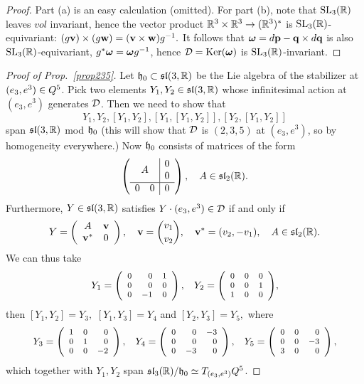 \begin{proof}
 Part (a) is an easy calculation (omitted). For part (b), note that ${\mathrm{SL}_3(\mathbb{R})}$ leaves $vol$ invariant, hence the vector product $\mathbb{R}^3\times \mathbb{R}^3\to(\mathbb{R}^3)^*$ is ${\mathrm{SL}_3(\mathbb{R})}$-equivariant: $(g{\mathbf v})\times (g{\mathbf w})=({\mathbf v}\times{\mathbf w})g^{-1}.$ It follows that $\boldsymbol{\omega}=d{\mathbf p}-\mathbf q\times d\mathbf q$ is also ${\mathrm{SL}_3(\mathbb{R})}$-equivariant, $g^*\boldsymbol{\omega}=\boldsymbol{\omega} g^{-1}$, hence ${\mathcal D}={\rm Ker}(\boldsymbol{\omega})$ is ${\mathrm{SL}_3(\mathbb{R})}$-invariant.\end{proof}

\begin{proof}[Proof of Prop.~\ref{prop235}] Let ${\mathfrak h}_0\subset\mathfrak{sl}(3,\mathbb{R})$ 
be the  Lie algebra of the stabilizer  at $(e_3, e^3)\in Q^5$. Pick two 
elements $Y_1, Y_2\in\mathfrak{sl}(3,\mathbb{R})$ whose infinitesimal action at $(e_3, e^3)$ generates ${\mathcal D}$.  Then we need to show that 
$$Y_1, Y_2, [Y_1,Y_2],[Y_1,[Y_1,Y_2]],  [Y_2, [Y_1,Y_2]]$$ span $\mathfrak{sl}(3,\mathbb{R})$ mod ${\mathfrak h}_0$ (this will show that ${\mathcal D}$ is $(2,3,5)$ at $(e_3,e^3) $, so by homogeneity everywhere.)
%
Now ${\mathfrak h}_0$ consists of matrices of the form 
%
$$
\left(\begin{array}{c|c}
A&\begin{matrix} 0\\ 0\end{matrix}\\
\hline
\begin{matrix}0& 0\end{matrix}&0
\end{array}
\right),\quad A\in\mathfrak{sl}_2(\mathbb{R}).
$$
%
Furthermore, $Y\in\mathfrak{sl}(3,\mathbb{R})$ satisfies $Y\cdot(e_3, e^3)\in{\mathcal D}$ if and only if 
$$Y=\left(\begin{array}{cc}A&{\mathbf v}\\ {\mathbf v}^*& 0\end{array}\right),\quad {\mathbf v}={v_1\choose v_2}, \quad {\mathbf v}^*=(v_2, -v_1),  \quad A\in\mathfrak{sl}_2(\mathbb{R}).$$ 
We can thus take 
%
$$ 
Y_1=\footnotesize{ 
\left( 
\begin{array}{rrr}
0&0&1\\ 
0&0&0\\ 
0&-1&0
\end{array} 
\right), \quad
Y_2=\left( 
\begin{array}{rrr}
0&0&0\\ 
0&0&1\\ 
1&0&0
\end{array}
\right)},$$
then $[Y_1, Y_2]=Y_3,$ $[Y_1,Y_3]=Y_4$ and $[Y_2,Y_3]=Y_5,$ where 
%
$$ 
Y_3=\footnotesize{ 
\left( 
\begin{array}{rrr}
1&0&0\\ 
0&1&0\\ 
0&0&-2
\end{array}   
\right),  \quad
%
Y_4=
\left( 
\begin{array}{rrr}
0&0&-3\\ 
0&0&0\\ 
0&-3&0
\end{array}  
\right), \quad
Y_5=
\left( 
\begin{array}{rrr}
0&0&0\\ 
0&0&-3\\ 
3&0&0
\end{array} 
\right),}
$$
which together with $Y_1, Y_2$ span $\mathfrak{sl}_3(\mathbb{R})/{\mathfrak h}_0\simeq T_{(e_3, e^3)}Q^5$.
\end{proof}




